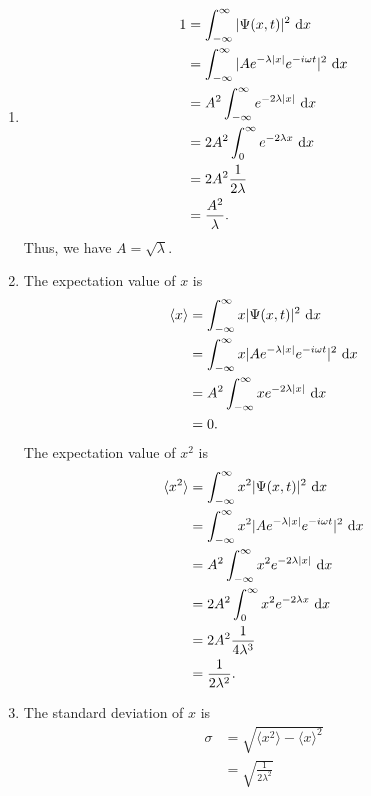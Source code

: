 \documentclass[en, oneside]{vivi}
\begin{document}
\begin{sol}
    \begin{enumerate}[label=(\alph*)]
        \item \begin{align*}
            1 &= \int_{-\infty}^{\infty} |\Psi (x, t)|^2 \dif x\\
            &= \int_{-\infty}^{\infty} |A e^{-\lambda |x|} e^{-i \omega t}|^2 \dif x\\
            &= A^2 \int_{-\infty}^{\infty} e^{-2 \lambda |x|} \dif x\\
            &= 2 A^2 \int_{0}^{\infty} e^{-2 \lambda x} \dif x\\
            &= 2 A^2 \frac{1}{2 \lambda}\\
            &= \frac{A^2}{\lambda}.
        \end{align*}
        Thus, we have $A = \sqrt{\lambda}$.
        \item The expectation value of $x$ is
        \begin{align*}
            \langle x \rangle &= \int_{-\infty}^{\infty} x |\Psi (x, t)|^2 \dif x\\
            &= \int_{-\infty}^{\infty} x |A e^{-\lambda |x|} e^{-i \omega t}|^2 \dif x\\
            &= A^2 \int_{-\infty}^{\infty} x e^{-2 \lambda |x|} \dif x\\
            &= 0.
        \end{align*}
        The expectation value of $x^2$ is
        \begin{align*}
            \langle x^2 \rangle &= \int_{-\infty}^{\infty} x^2 |\Psi (x, t)|^2 \dif x\\
            &= \int_{-\infty}^{\infty} x^2 |A e^{-\lambda |x|} e^{-i \omega t}|^2 \dif x\\
            &= A^2 \int_{-\infty}^{\infty} x^2 e^{-2 \lambda |x|} \dif x\\
            &= 2 A^2 \int_{0}^{\infty} x^2 e^{-2 \lambda x} \dif x\\
            &= 2 A^2 \frac{1}{4 \lambda^3}\\
            &= \frac{1}{2 \lambda^2}.
        \end{align*}
        \item The standard deviation of $x$ is
        \begin{align*}
            \sigma &= \sqrt{\langle x^2 \rangle - \langle x \rangle^2}\\
            &= \sqrt{\frac{1}{2 \lambda^2}}\\

\end{align*}
\end{enumerate}
\end{sol}
\end{document}
